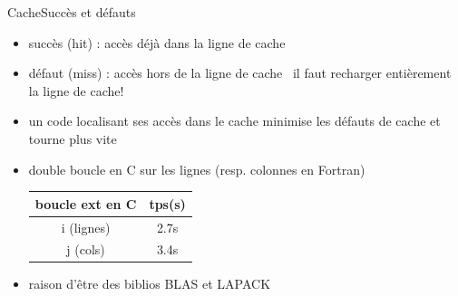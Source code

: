 \documentclass[11pt,mathserif]{beamer}
\newcommand{\gezi}{\faLongArrowRight}
\newcommand{\hand}{\faHandORight}
\newcommand{\argi}{\faLightbulbO}
\newcommand{\pozik}{\faSmileO}
\newcommand{\triste}{\faFrownO}
\newcommand{\adibi}{\faCommentO}
\newcommand{\mylang}{C}
\newcommand{\extlang}{c}
\newcommand{\mylang}{fortran}
\newcommand{\extlang}{f90}
\newcommand{\includeSrc}[1]{}
\begin{document}
\begin{frame}{Cache}{Succès et défauts}
\begin{itemize}[<+->]
  \item[\pozik] succès (hit) : accès déjà dans la ligne de cache 
  \item[\triste] défaut (miss) : accès hors de la ligne de cache \gezi\ il faut recharger entièrement la ligne de cache!
  \item[\argi] un code localisant ses accès dans le cache minimise les défauts de cache et tourne plus vite
  \item[\adibi] double boucle en C sur les lignes (resp. colonnes en Fortran)
\begin{minipage}[c]{0.49\linewidth}
  \includeSrc{code/loop_col}
\end{minipage}
\begin{minipage}[r]{0.49\linewidth}
    \begin{tabular}{|c|c|}
    \hline
     boucle ext en C & tps(s)  \\
    \hline
      i (lignes) & 2.7s \\
      j (cols)  & 3.4s \\
    \hline
    \end{tabular}
\end{minipage}
\item[\hand] raison d'être des biblios BLAS et LAPACK
\end{itemize}
\end{frame}

\end{document}
